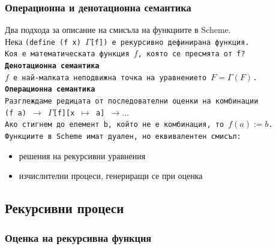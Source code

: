 \documentclass[alsotrans]{beamerswitch}
\begin{document}
\begin{frame}
  \frametitle{Операционна и денотационна семантика}

  Два подхода за описание на смисъла на функциите в Scheme.\\
  \pause
  Нека \tt{(define (f x) $\Gamma$[f])} е рекурсивно дефинирана функция.\\
  \pause
  \alert{Коя е математическата функция $f$, която се пресмята от \tt f?}\\[2ex]
  \pause
  \textbf{Денотационна семантика}\\
  $f$ е най-малката неподвижна точка на уравнението $F = \Gamma(F)$.\\[2ex]
  \pause
  \textbf{Операционна семантика}\\
  Разглеждаме редицата от последователни оценки на комбинации\\
  \tt{(f a)} $\rightarrow$ \tt{$\Gamma$[f][x $\mapsto$ a]} $\rightarrow\ldots$\\
  Ако стигнем до елемент \tt b, който не е комбинация, то $f(a) := b$.\\[2ex]
  \pause
  \alert{Функциите в Scheme имат дуален, но еквивалентен смисъл:}
  \begin{itemize}
  \item решения на рекурсивни уравнения
  \item изчислителни процеси, генериращи се при оценка
  \end{itemize}
\end{frame}

\subsection{Рекурсивни процеси}

\begin{frame}
  \frametitle{Оценка на рекурсивна функция}

  \begin{center}
    \sizeboth\scriptsize
  \end{center}
\end{frame}
\end{document}
